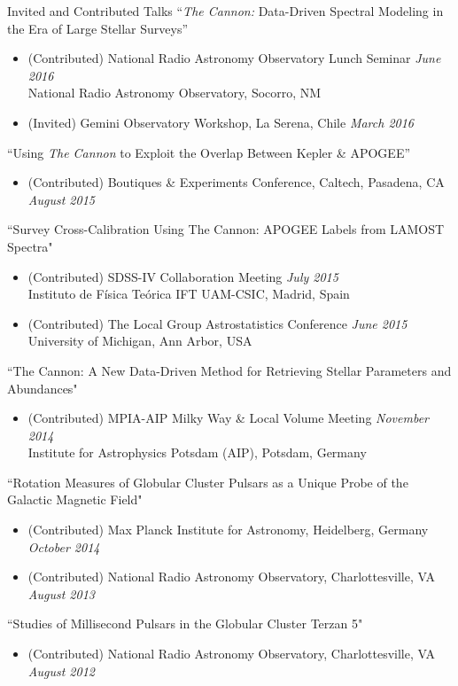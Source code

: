 \documentclass{resume} %
\begin{document}
\begin{rSection}{Invited and Contributed Talks}
``\emph{The Cannon:} Data-Driven Spectral Modeling in the Era of Large Stellar Surveys''
\begin{itemize}
  \item
    (Contributed) National Radio Astronomy Observatory Lunch Seminar 
    \hfill {\em June 2016} \\
    National Radio Astronomy Observatory, Socorro, NM
  \item
  (Invited) Gemini Observatory Workshop, La Serena, Chile \hfill {\em March 2016}
\end{itemize}
``Using \emph{The Cannon} to Exploit the Overlap Between Kepler \& APOGEE''
\begin{itemize}
  \item
    (Contributed) Boutiques \& Experiments Conference, Caltech, Pasadena, CA \hfill {\em August 2015}
\end{itemize}
``Survey Cross-Calibration Using The Cannon: APOGEE Labels from LAMOST Spectra"
\begin{itemize}
\item
(Contributed) SDSS-IV Collaboration Meeting \hfill {\em July 2015} \\
Instituto de Física Teórica IFT UAM-CSIC, Madrid, Spain
\item
(Contributed) The Local Group Astrostatistics Conference \hfill {\em June 2015} \\
University of Michigan, Ann Arbor, USA
\end{itemize}

``The Cannon: A New Data-Driven Method for Retrieving Stellar Parameters and Abundances"
\begin{itemize}
\item
(Contributed) MPIA-AIP Milky Way \& Local Volume Meeting  \hfill {\em November 2014} \\
Institute for Astrophysics Potsdam (AIP), Potsdam, Germany
\end{itemize}

``Rotation Measures of Globular Cluster Pulsars as a Unique Probe of the Galactic Magnetic Field"
\begin{itemize}
\item
(Contributed) Max Planck Institute for Astronomy,
Heidelberg, Germany \hfill {\em October 2014}
\item
(Contributed) National Radio Astronomy Observatory, 
Charlottesville, VA \hfill {\em August 2013} 
\end{itemize}


``Studies of Millisecond Pulsars in the Globular Cluster Terzan 5" 
\begin{itemize}
\item
(Contributed) National Radio Astronomy Observatory, 
Charlottesville, VA \hfill {\em August 2012} 
\end{itemize}

\end{rSection}
\end{document}
